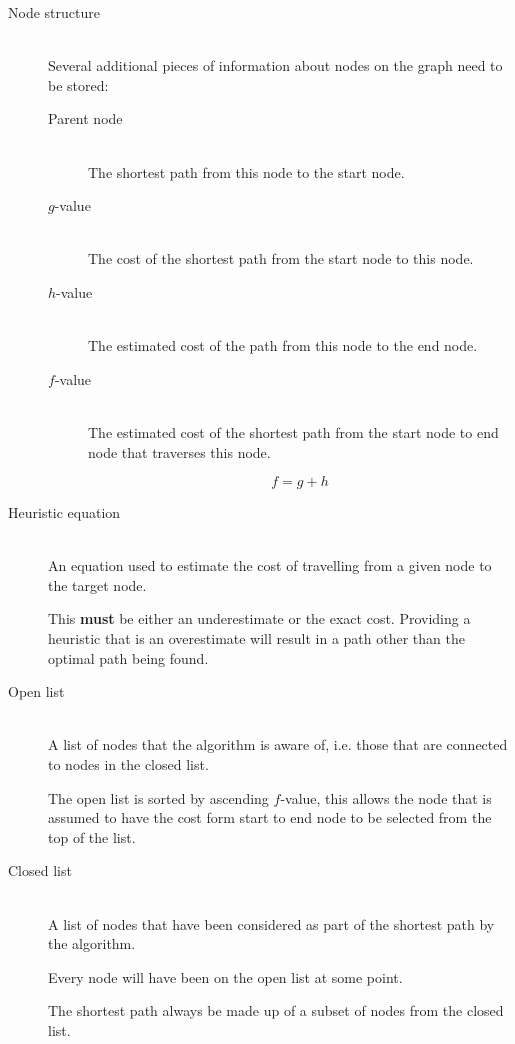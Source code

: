 \documentclass[a4paper]{article}
\begin{document}
\begin{description}
  \item[Node structure] \hfill \\
    Several additional pieces of information about nodes on the graph need to be
    stored:

    \begin{description}
      \item[Parent node] \hfill \\
        The shortest path from this node to the start node.

      \item[$g$-value] \hfill \\
        The cost of the shortest path from the start node to this node.

      \item[$h$-value] \hfill \\
        The estimated cost of the path from this node to the end node.

      \item[$f$-value] \hfill \\
        The estimated cost of the shortest path from the start node to end node
        that traverses this node.

        \[
          f = g + h
        \]

    \end{description}

  \item[Heuristic equation] \hfill \\
    An equation used to estimate the cost of travelling from a given node to the
    target node.

    This \textbf{must} be either an underestimate or the exact cost. Providing a
    heuristic that is an overestimate will result in a path other than the
    optimal path being found.

  \item[Open list] \hfill \\
    A list of nodes that the algorithm is aware of, i.e. those that are
    connected to nodes in the closed list.

    The open list is sorted by ascending $f$-value, this allows the node that is
    assumed to have the cost form start to end node to be selected from the top
    of the list.

  \item[Closed list] \hfill \\
    A list of nodes that have been considered as part of the shortest path by
    the algorithm.

    Every node will have been on the open list at some point.

    The shortest path always be made up of a subset of nodes from the closed
    list.

\end{description}
\end{document}
